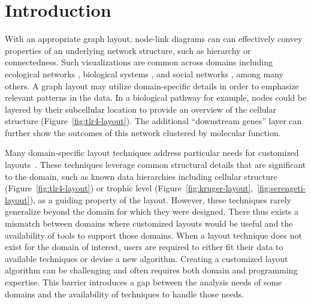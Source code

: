 \section{Introduction}
With an appropriate graph layout, node-link diagrams can
can effectively convey properties of an underlying
network structure, such as hierarchy or connectedness. Such visualizations are common across domains including ecological networks
\cite{hinke2004visualizing,harper2006dynamic,lavigne1996cod,baskerville2011spatial,yodzis1998local,cohen2003ecological,kearney2016blog,benson2016higher,kruger2017},
biological systems
\cite{barsky2008cerebral,shannon2003cytoscape,gehlenborg2010visualization,saraiya2005visualizing,becker2001graph},
and social networks
\cite{scott1988social,rothenberg1998using,fitzpatrick2001preventable,mcelroy2003network,fu2011hiv}, 
among many others. A graph layout may utilize
domain-specific details in order to emphasize relevant patterns in the
data. 
In a biological pathway for example, nodes could be layered by their 
subcellular location to provide an overview of the cellular structure
(Figure~\ref{fig:tlr4-layout}). The additional ``downstream genes'' layer
can further show the outcomes of this network clustered by molecular function.

\tlrfourLayout

Many domain-specific layout techniques address particular needs
for customized layouts~\cite{barsky2008cerebral,genc2003constrained,shannon2003cytoscape,kearney2017d3,kearney2017ecopath}. These
techniques leverage common structural details that are significant to the
domain, such as known data hierarchies including cellular 
structure (Figure~\ref{fig:tlr4-layout}) or trophic level
(Figure~\ref{fig:kruger-layout},~\ref{fig:serengeti-layout}), as a guiding property of the
layout. However, these techniques rarely generalize beyond the domain for
which they were designed. There thus exists a mismatch between domains
where customized layouts would be useful and the availability of tools to
support those domains. When a layout technique does not exist for the
domain of interest, users are required to either fit their data
to available techniques or devise a new algorithm. Creating a
customized layout algorithm can be challenging and often requires both
domain and programming expertise.
This barrier introduces a gap between the 
analysis needs of some domains and the availability of techniques to
handle those needs.

